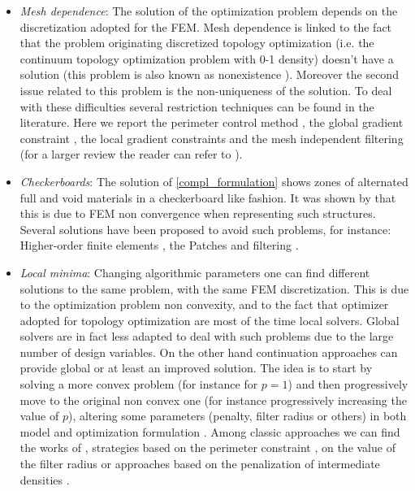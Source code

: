 \begin{itemize}
\item \textit{Mesh dependence}: The solution of the optimization problem depends on the discretization adopted for the FEM. Mesh dependence is linked to the fact that the problem originating discretized  topology optimization (i.e. the continuum topology optimization problem with 0-1 density) doesn't have a solution (this problem is also known as nonexistence \cite{sigmund1998numerical}). Moreover the second issue related to this problem is the non-uniqueness of the solution. To deal with these difficulties several restriction techniques can be found in the literature. Here we report the perimeter control method \cite{ambrosio1993optimal}, the global gradient constraint \cite{bendsoe1995optimization}, the local gradient constraints \cite{niordson1983optimal} and the mesh independent filtering \cite{sigmund1994design,sigmund1997design} (for a larger review the reader can refer to \cite{sigmund2007morphology}).
\item \textit{Checkerboards}: The solution of \ref{compl_formulation} shows zones of alternated full and void materials in a checkerboard like fashion. It was shown by \cite{jog1996stability}  that this is due to FEM non convergence when representing such structures.
Several solutions have been proposed to avoid such problems, for instance:
Higher-order finite elements \cite{diaz1995checkerboard,jog1996stability}, the Patches \cite{bendsoe1993topology} and filtering \cite{sigmund1994design}. 
\item \textit{Local minima}: Changing algorithmic parameters one can find different solutions to the same problem, with the same FEM discretization. This is due to the optimization problem non convexity, and to the fact that optimizer adopted for topology optimization are most of the time local solvers. Global solvers are in fact less adapted to deal with such problems due to the large number of design variables. On the other hand continuation approaches can provide global or at least an improved solution. The idea is to start by solving a more convex problem (for instance for $p=1$) and then progressively move to the original non convex one (for instance progressively increasing the value of $p$), altering some parameters (penalty, filter radius or others) in both model and optimization formulation . Among classic approaches we can find the works of
\cite{allaire1993numerical,allaire1993topology}, strategies based on the perimeter constraint \cite{haber1996new}, on the value of the filter radius \cite{sigmund1997design,sigmund1997designb} or approaches based on the penalization of intermediate densities \cite{guedes1997prediction} .
\end{itemize}
